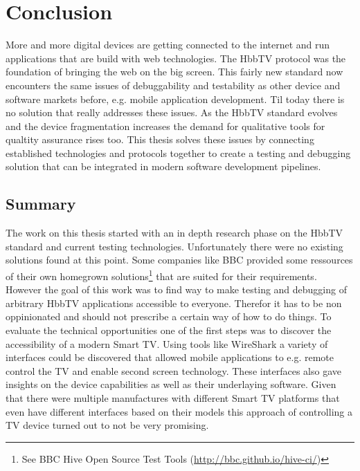 \chapter{Conclusion\label{cha:chapter7}}

%

More and more digital devices are getting connected to the internet and run applications that are build with web
technologies. The HbbTV protocol was the foundation of bringing the web on the big screen. This fairly new standard
now encounters the same issues of debuggability and testability as other device and software markets before, e.g.
mobile application development. Til today there is no solution that really addresses these issues. As the HbbTV
standard evolves and the device fragmentation increases the demand for qualitative tools for qualtity assurance
rises too. This thesis solves these issues by connecting established technologies and protocols together to create
a testing and debugging solution that can be integrated in modern software development pipelines.

\section{Summary\label{sec:summary}}


The work on this thesis started with an in depth research phase on the HbbTV standard and current testing technologies.
Unfortunately there were no existing solutions found at this point. Some companies like BBC provided some ressources
of their own homegrown solutions\footnote{See BBC Hive Open Source Test Tools (\url{http://bbc.github.io/hive-ci/})}
that are suited for their requirements. However the goal of this work was to find way to make testing and debugging
of arbitrary HbbTV applications accessible to everyone. Therefor it has to be non oppinionated and should not prescribe
a certain way of how to do things. To evaluate the technical opportunities one of the first steps was to discover
the accessibility of a modern Smart TV. Using tools like WireShark a variety of interfaces could be discovered that
allowed mobile applications to e.g. remote control the TV and enable second screen technology. These interfaces also
gave insights on the device capabilities as well as their underlaying software. Given that there were multiple
manufactures with different Smart TV platforms that even have different interfaces based on their models this approach
of controlling a TV device turned out to not be very promising.

